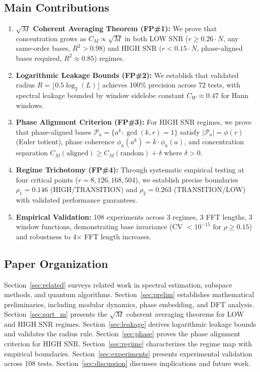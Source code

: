 \documentclass[11pt,twocolumn]{article}
\theoremstyle{definition}
\theoremstyle{remark}
\begin{document}
\subsection{Main Contributions}

\begin{enumerate}
    \item \textbf{$\sqrt{M}$ Coherent Averaging Theorem (FP\#1):} We prove that concentration grows as $C_M \propto \sqrt{M}$ in both LOW SNR ($r \geq 0.26 \cdot N$, any same-order bases, $R^2 > 0.98$) and HIGH SNR ($r < 0.15 \cdot N$, phase-aligned bases required, $R^2 \approx 0.85$) regimes.

    \item \textbf{Logarithmic Leakage Bounds (FP\#2):} We establish that validated radius $R = \lfloor 0.5 \log_2(L) \rfloor$ achieves 100\% precision across 72 tests, with spectral leakage bounded by window sidelobe constant $C_W \approx 0.47$ for Hann windows.

    \item \textbf{Phase Alignment Criterion (FP\#3):} For HIGH SNR regimes, we prove that phase-aligned bases $\mathcal{P}_a = \{a^k : \gcd(k,r)=1\}$ satisfy $|\mathcal{P}_a| = \phi(r)$ (Euler totient), phase coherence $\phi_h(a^k) = k \cdot \phi_h(a)$, and concentration separation $C_M(\text{aligned}) \geq C_M(\text{random}) + \delta$ where $\delta > 0$.

    \item \textbf{Regime Trichotomy (FP\#4):} Through systematic empirical testing at four critical points ($r=8, 126, 168, 504$), we establish precise boundaries $\rho_1 = 0.146$ (HIGH/TRANSITION) and $\rho_2 = 0.263$ (TRANSITION/LOW) with validated performance guarantees.

    \item \textbf{Empirical Validation:} 108 experiments across 3 regimes, 3 FFT lengths, 3 window functions, demonstrating base invariance (CV $< 10^{-15}$ for $\rho \geq 0.15$) and robustness to 4× FFT length increases.
\end{enumerate}

\subsection{Paper Organization}

Section~\ref{sec:related} surveys related work in spectral estimation, subspace methods, and quantum algorithms. Section~\ref{sec:prelim} establishes mathematical preliminaries, including modular dynamics, phase embedding, and DFT analysis. Section~\ref{sec:sqrt_m} presents the $\sqrt{M}$ coherent averaging theorems for LOW and HIGH SNR regimes. Section~\ref{sec:leakage} derives logarithmic leakage bounds and validates the radius rule. Section~\ref{sec:phase} proves the phase alignment criterion for HIGH SNR. Section~\ref{sec:regime} characterizes the regime map with empirical boundaries. Section~\ref{sec:experiments} presents experimental validation across 108 tests. Section~\ref{sec:discussion} discusses implications and future work.
\end{document}
